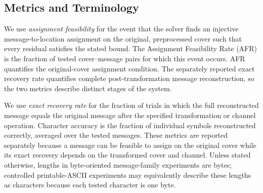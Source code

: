 \documentclass[preprint,12pt]{elsarticle}
\theoremstyle{plain}
\begin{document}
\subsection{Metrics and Terminology}
\label{sec:metrics}

We use \emph{assignment feasibility} for the event that the solver finds an
injective message-to-location assignment on the original, preprocessed cover
such that every residual satisfies the stated bound. The Assignment Feasibility
Rate (AFR) is the fraction of tested cover--message pairs for which this event
occurs. AFR quantifies the original-cover assignment condition. The separately
reported exact recovery rate quantifies complete post-transformation message
reconstruction, so the two metrics describe distinct stages of the system.

We use \emph{exact recovery rate} for the fraction of trials in which the full
reconstructed message equals the original message after the specified
transformation or channel operation. Character accuracy is the fraction of
individual symbols reconstructed correctly, averaged over the tested
messages. These metrics are reported separately because a message can be
feasible to assign on the original cover while its exact recovery depends on
the transformed cover and channel. Unless stated otherwise, lengths in byte-oriented message-family
experiments are bytes; controlled printable-ASCII experiments may equivalently
describe these lengths as characters because each tested character is one
byte.
\end{document}
